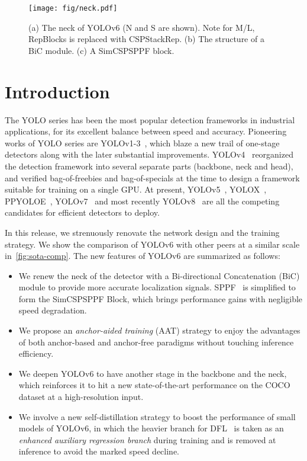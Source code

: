 \documentclass[10pt,twocolumn,letterpaper]{article}
\begin{document}
\begin{figure*}[t]
  \begin{center}
    \texttt{[image: fig/neck.pdf]}
  \end{center}
    \vskip -0.2in
    \caption{(a) The neck of YOLOv6 (N and S are shown). Note for M/L, RepBlocks is replaced with CSPStackRep. (b) The structure of a BiC module. (c) A SimCSPSPPF block.}
    \label{fig:neck}
\end{figure*}

\section{Introduction}
\label{sec:intro}
The YOLO series has been the most popular detection frameworks in industrial applications, for its excellent balance between speed and accuracy. Pioneering works of YOLO series are YOLOv1-3~\cite{redmon2016you,redmon2017yolo9000,redmon2018yolov3}, which blaze a new trail of one-stage detectors along with the later substantial improvements. YOLOv4~\cite{bochkovskiy2020yolov4} reorganized the detection framework into several separate parts (backbone, neck and head), and verified bag-of-freebies and bag-of-specials at the time to design a framework suitable for training on a single GPU. At present, YOLOv5~\cite{yolov5}, YOLOX~\cite{ge2021yolox}, PPYOLOE~\cite{xu2022ppyoloe}, YOLOv7~\cite{wang2022yolov7} and most recently YOLOv8~\cite{yolov8} are all the competing candidates for efficient detectors to deploy. 

In this release, we strenuously renovate the network design and the training strategy. We show the comparison of YOLOv6 with other peers at a similar scale in~\cref{fig:sota-comp}. The new features of YOLOv6 are summarized as follows:

\begin{itemize}
  \item We renew the neck of the detector with a Bi-directional Concatenation (BiC) module to provide more accurate localization signals. SPPF~\cite{yolov5} is simplified to form the SimCSPSPPF Block, which brings performance gains with negligible speed degradation.
  
  \item We propose an \emph{anchor-aided training} (AAT) strategy to enjoy the advantages of both anchor-based and anchor-free paradigms without touching inference efficiency.
  
  \item We deepen YOLOv6 to have another stage in the backbone and the neck, which reinforces it to hit a new state-of-the-art performance on the COCO dataset at a high-resolution input.

  \item We involve a new self-distillation strategy to boost the performance of small models of YOLOv6, in which the heavier branch for DFL~\cite{li2020generalized} is taken as an \emph{enhanced auxiliary regression branch} during training and is removed at inference to avoid the marked speed decline.
\end{itemize}
\end{document}
